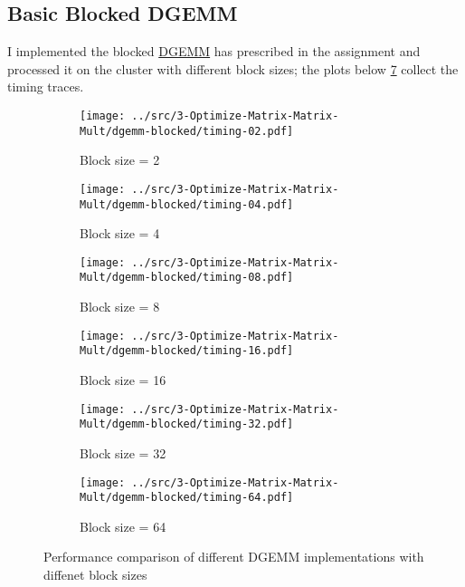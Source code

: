 
\subsection{Basic Blocked DGEMM}

I implemented the blocked \href{./../src/3-Optimize-Matrix-Matrix-Mult/dgemm-blocked.c}{DGEMM} has prescribed in the assignment and processed it on the cluster with different block sizes; the plots below \ref{fig:dgemm-performance} collect the timing traces.

\begin{figure}[h]
    \centering
    \begin{subfigure}[b]{0.48\textwidth}
        \centering
        \texttt{[image: ../src/3-Optimize-Matrix-Matrix-Mult/dgemm-blocked/timing-02.pdf]}
        \caption{Block size = 2}
        \label{fig:timing-02}
    \end{subfigure}
    \hfill
    \begin{subfigure}[b]{0.48\textwidth}
        \centering
        \texttt{[image: ../src/3-Optimize-Matrix-Matrix-Mult/dgemm-blocked/timing-04.pdf]}
        \caption{Block size = 4}
        \label{fig:timing-04}
    \end{subfigure}
    
    \vspace{1em}
    
    \begin{subfigure}[b]{0.48\textwidth}
        \centering
        \texttt{[image: ../src/3-Optimize-Matrix-Matrix-Mult/dgemm-blocked/timing-08.pdf]}
        \caption{Block size = 8}
        \label{fig:timing-08}
    \end{subfigure}
    \hfill
    \begin{subfigure}[b]{0.48\textwidth}
        \centering
        \texttt{[image: ../src/3-Optimize-Matrix-Matrix-Mult/dgemm-blocked/timing-16.pdf]}
        \caption{Block size = 16}
        \label{fig:timing-16}
    \end{subfigure}
    
    \vspace{1em}
    
    \begin{subfigure}[b]{0.48\textwidth}
        \centering
        \texttt{[image: ../src/3-Optimize-Matrix-Matrix-Mult/dgemm-blocked/timing-32.pdf]}
        \caption{Block size = 32}
        \label{fig:timing-32}
    \end{subfigure}
    \hfill
    \begin{subfigure}[b]{0.48\textwidth}
        \centering
        \texttt{[image: ../src/3-Optimize-Matrix-Matrix-Mult/dgemm-blocked/timing-64.pdf]}
        \caption{Block size = 64}
        \label{fig:timing-64}
    \end{subfigure}
    
    \caption{Performance comparison of different DGEMM implementations with diffenet block sizes}
    \label{fig:dgemm-performance}
\end{figure}

